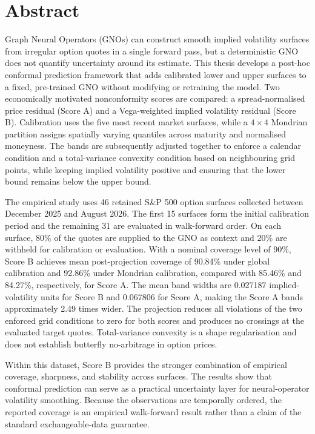 \chapter*{Abstract}

Graph Neural Operators (GNOs) can construct smooth implied volatility surfaces from irregular option quotes in a single forward pass, but a deterministic GNO does not quantify uncertainty around its estimate. This thesis develops a post-hoc conformal prediction framework that adds calibrated lower and upper surfaces to a fixed, pre-trained GNO without modifying or retraining the model. Two economically motivated nonconformity scores are compared: a spread-normalised price residual (Score A) and a Vega-weighted implied volatility residual (Score B). Calibration uses the five most recent market surfaces, while a $4\times4$ Mondrian partition assigns spatially varying quantiles across maturity and normalised moneyness. The bands are subsequently adjusted together to enforce a calendar condition and a total-variance convexity condition based on neighbouring grid points, while keeping implied volatility positive and ensuring that the lower bound remains below the upper bound.

The empirical study uses 46 retained S\&P 500 option surfaces collected between December 2025 and August 2026. The first 15 surfaces form the initial calibration period and the remaining 31 are evaluated in walk-forward order. On each surface, 80\% of the quotes are supplied to the GNO as context and 20\% are withheld for calibration or evaluation. With a nominal coverage level of 90\%, Score B achieves mean post-projection coverage of 90.84\% under global calibration and 92.86\% under Mondrian calibration, compared with 85.46\% and 84.27\%, respectively, for Score A. The mean band widths are 0.027187 implied-volatility units for Score B and 0.067806 for Score A, making the Score A bands approximately 2.49 times wider. The projection reduces all violations of the two enforced grid conditions to zero for both scores and produces no crossings at the evaluated target quotes. Total-variance convexity is a shape regularisation and does not establish butterfly no-arbitrage in option prices.

Within this dataset, Score B provides the stronger combination of empirical coverage, sharpness, and stability across surfaces. The results show that conformal prediction can serve as a practical uncertainty layer for neural-operator volatility smoothing. Because the observations are temporally ordered, the reported coverage is an empirical walk-forward result rather than a claim of the standard exchangeable-data guarantee.
